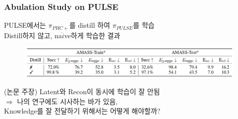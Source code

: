 \documentclass[11pt,xcolor={dvipsnames},hyperref={pdftex,pdfpagemode=UseNone,hidelinks,pdfdisplaydoctitle=true},usepdftitle=false]{beamer}
\begin{document}
\begin{frame}
\frametitle{Abulation Study on PULSE}
PULSE에서는 $\pi_{PHC+}$를 distill 하여 $\pi_{PULSE}$를 학습 \\
Distill하지 않고, na$\ddot{i}$ve하게 학습한 결과

\begin{figure}
    \centering
    \includegraphics[width=\textwidth]{figs/distill_ab.png}
\end{figure}

(논문 주장) Latent와 Recon이 동시에 학습이 잘 안됨 \\
$\Rightarrow$ 나의 연구에도 시사하는 바가 있음, \\
Knowledge를 잘 전달하기 위해서는 어떻게 해야할까?

\end{frame}    

\begin{frame}
\end{frame}

\lastslide
\end{document}
